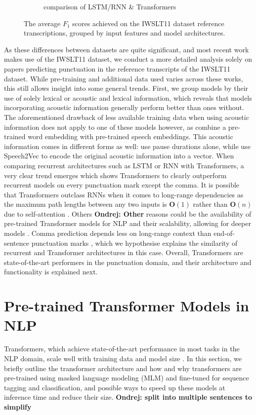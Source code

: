 \documentclass[bsc,deptreport,ai]{infthesis} %
\newcommand{\Ondrej}[1]{{\color{red} \textbf{Ondrej: #1}}}
\begin{document}
\begin{figure}
\begin{subfigure}{.49\textwidth}
\caption{comparison of LSTM/RNN \& Transformers}%
\end{subfigure}
\caption{The average $F_1$ scores achieved on the IWSLT11 dataset reference transcriptions, grouped by input features and model architectures.}
\end{figure}

As these differences between datasets are quite significant, and most recent work makes use of the IWSLT11 dataset, we conduct a more detailed analysis solely on papers predicting punctuation in the reference transcripts of the IWSLT11 dataset. While pre-training and additional data used varies across these works, this still allows insight into some general trends. First, we group models by their use of solely lexical or acoustic and lexical information, which reveals that models incorporating acoustic information generally perform better than ones without. The aforementioned drawback of less available training data when using acoustic information does not apply to one of these models however, as \citet{yi2019speech2vec} combine a pre-trained word embedding with pre-trained speech embeddings. This acoustic information comes in different forms as well: \citet{Tilk2015} use pause durations alone, while \citet{yi2019speech2vec} use Speech2Vec \citep{chung2018} to encode the original acoustic information into a vector. When comparing recurrent architectures such as LSTM or RNN with Transformers, a very clear trend emerges which shows Transformers to clearly outperform recurrent models on every punctuation mark except the comma. It is possible that Transformers outclass RNNs when it comes to long-range dependencies as the maximum path lengths between any two inputs is $\mathbf{O}(1)$ rather than $\mathbf{O}(n)$ due to self-attention \citep{vaswani2017}. Others\Ondrej{Other} reasons could be the availability of pre-trained Transformer models for NLP and their scalability, allowing for deeper models \citep{transformersurvey}. Comma prediction depends less on long-range context than end-of-sentence punctuation marks \citep{beeferman1998}, which we hypothesise explains the similarity of recurrent and Transformer architectures in this case. Overall, Transformers are state-of-the-art performers in the punctuation domain, and their architecture and functionality is explained next.


\section{Pre-trained Transformer Models in NLP}
Transformers, which achieve state-of-the-art performance in most tasks in the NLP domain, scale well with training data and model size \citep{huggingface}. In this section, we briefly outline the transformer architecture and how and why transformers are pre-trained using masked language modeling (MLM) and fine-tuned for sequence tagging and classification, and possible ways to speed up these models at inference time and reduce their size.\Ondrej{split into multiple sentences to simplify}
\end{document}
